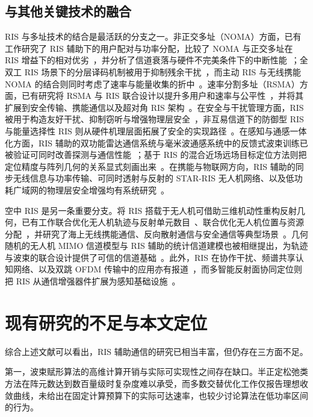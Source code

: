 \subsection{与其他关键技术的融合}

RIS 与多址技术的结合是最活跃的分支之一。非正交多址（NOMA）方面，已有工作研究了 RIS 辅助下的用户配对与功率分配，比较了 NOMA 与正交多址在 RIS 增益下的相对优劣~\cite{zheng2020ris}，并分析了信道衰落与硬件不完美条件下的中断性能~\cite{guo2021ris,hemanth2020ris}；全双工 RIS 场景下的分层译码机制被用于抑制残余干扰~\cite{andiappan2023ris}，而主动 RIS 与无线携能 NOMA 的结合则同时考虑了速率与能量收集的折中~\cite{cantos2024ris}。速率分割多址（RSMA）方面，已有研究将 RSMA 与 RIS 联合设计以提升多用户和速率与公平性~\cite{bansal2021ris,zhang2024ris}，并将其扩展到安全传输、携能通信以及超对角 RIS 架构~\cite{gao2023ris,camana2022ris,li2024ris}。在安全与干扰管理方面，RIS 被用于构造友好干扰、抑制窃听与增强物理层安全~\cite{jiang2020ris,xiu2020ris}，非互易信道下的防御型 RIS 与能量选择性 RIS 则从硬件机理层面拓展了安全的实现路径~\cite{chenhu2025ris,hong2026ris}。在感知与通感一体化方面，RIS 辅助的双功能雷达通信系统与毫米波通感系统中的反馈式波束训练已被验证可同时改善探测与通信性能~\cite{li2023ris,cao2023ris}；基于 RIS 的混合近场远场目标定位方法则把定位精度与阵列几何的关系显式刻画出来~\cite{zhu2026ris}。在携能与物联网方向，RIS 辅助的同步无线信息与功率传输、可同时透射与反射的 STAR-RIS 无人机网络、以及低功耗广域网的物理层安全增强均有系统研究~\cite{xie2025ris,khoshafa2024ris}。

空中 RIS 是另一条重要分支。将 RIS 搭载于无人机可借助三维机动性重构反射几何，已有工作联合优化无人机轨迹与反射单元数目~\cite{zhao2026ris}、联合优化无人机位置与资源分配~\cite{nguyen2022ris}，并研究了海上无线携能通信、反向散射通信与安全通信等典型场景~\cite{yuan2025ris,wang2023ris,ye2024ris,sun2021ris}。几何随机的无人机 MIMO 信道模型与 RIS 辅助的统计信道建模也被相继提出，为轨迹与波束的联合设计提供了可信的信道基础~\cite{wang2024ris}。此外，RIS 在协作干扰、频谱共享认知网络、以及双跳 OFDM 传输中的应用亦有报道~\cite{peng2023ris,srivastava2025ris,pradhan2020ris}，而多智能反射面协同定位则把 RIS 从通信增强器件扩展为感知基础设施~\cite{ghermezchesh2023ris}。

\section{现有研究的不足与本文定位}

综合上述文献可以看出，RIS 辅助通信的研究已相当丰富，但仍存在三方面不足。

第一，波束赋形算法的高维计算开销与实际可实现性之间存在缺口。半正定松弛类方法在阵元数达到数百量级时复杂度难以承受，而多数交替优化工作仅报告理想收敛曲线，未给出在固定计算预算下的实际可达速率，也较少讨论算法在低功率区间的行为。

